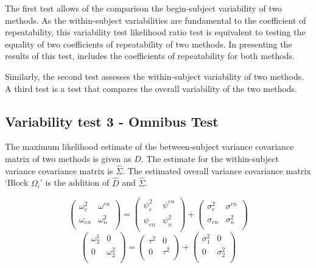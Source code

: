 \documentclass[12pt, a4paper]{report}
\theoremstyle{plain}
\theoremstyle{definition}
\theoremstyle{remark}
\begin{document}

The first test allows of the comparison the begin-subject variability of two methods. As the within-subject variabilities are fundamental to the coefficient of repeatability, this variability test likelihood ratio test is equivalent to testing the equality of two coefficients of repeatability of two methods. In presenting the results of this test, \citet{roy} includes the coefficients of repeatability for both methods.



Similarly, the second test
assesses the within-subject variability of two methods. A third test is a test that compares the overall variability of the two methods.




\subsection{Variability test 3 - Omnibus Test}
The maximum likelihood estimate of the between-subject variance
covariance matrix of two methods is given as $D$. The estimate for
the within-subject variance covariance matrix is $\hat{\Sigma}$.
The estimated overall variance covariance matrix `Block
$\Omega_{i}$' is the addition of $\hat{D}$ and $\hat{\Sigma}$.




\begin{equation}
\left( \begin{array}{cc}
\omega^2_{e} & \omega^{en} \\
\omega_{en} & \omega^2_{n} \\
\end{array}\right)
=
\left( \begin{array}{cc}
\psi^2_{e} & \psi^{en} \\
\psi_{en} & \psi^2_{n} \\
\end{array}\right)
+
\left( \begin{array}{cc}
\sigma^2_{e} & \sigma^{en} \\
\sigma_{en} & \sigma^2_{n} \\
\end{array}\right)
\end{equation}
\[\left(\begin{array}{cc}
\omega^1_2  & 0 \\
0 & \omega^2_2 \\
\end{array}  \right)
=  \left(
\begin{array}{cc}
\tau^2  & 0 \\
0 & \tau^2 \\
\end{array} \right)+
\left(
\begin{array}{cc}
\sigma^2_1  & 0 \\
0 & \sigma^2_2 \\
\end{array}\right)
\]
\end{document}
